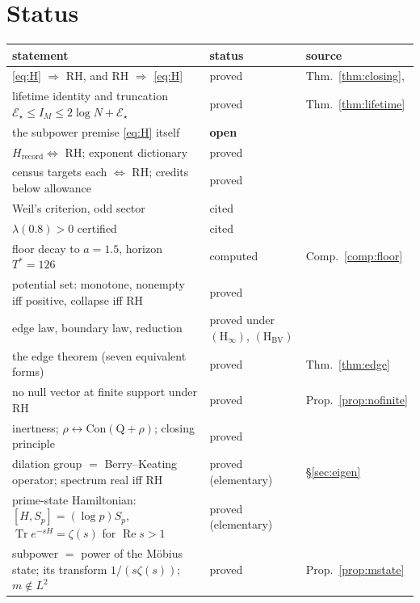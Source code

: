 \documentclass[11pt]{article}
\theoremstyle{definition}
\theoremstyle{remark}
\newcommand{\Con}{\mathrm{Con}}
\newcommand{\Tst}{T^{*}}
\newcommand{\Hrec}{H_{\mathrm{record}}}
\newcommand{\Ree}{\operatorname{Re}}
\begin{document}
\section{Status}\label{sec:status}
\begin{center}\footnotesize
\begin{tabular}{L{0.52\textwidth}L{0.2\textwidth}L{0.2\textwidth}}
\toprule
statement & status & source\\
\midrule
\eqref{eq:H} $\Rightarrow$ RH, and RH $\Rightarrow$ \eqref{eq:H} & proved & Thm.~\ref{thm:closing}, \cite{titchmarsh}\\
lifetime identity and truncation $\mathcal E_\star\le I_M\le2\log N+\mathcal E_\star$ & proved & Thm.~\ref{thm:lifetime}\\
the subpower premise \eqref{eq:H} itself & \textbf{open} & \cite{running,summary}\\
$\Hrec\iff$ RH; exponent dictionary & proved & \cite{hrec}\\
census targets each $\iff$ RH; credits below allowance & proved & \cite{census,censusaudit}\\
Weil's criterion, odd sector & cited & \cite{weil52,suzuki}\\
$\lambda(0.8)>0$ certified & cited & \cite{zhu}\\
floor decay to $a=1.5$, horizon $\Tst=126$ & computed & Comp.~\ref{comp:floor}\\
potential set: monotone, nonempty iff positive, collapse iff RH & proved & \cite{potential}\\
edge law, boundary law, reduction & proved under $(\mathrm H_\infty)$, $(\mathrm H_{\mathrm{BV}})$ & \cite{window}\\
the edge theorem (seven equivalent forms) & proved & Thm.~\ref{thm:edge}\\
no null vector at finite support under RH & proved & Prop.~\ref{prop:nofinite}\\
inertness; $\rho\leftrightarrow\Con(\mathrm Q+\rho)$; closing principle & proved & \cite{gstring}\\
dilation group $=$ Berry--Keating operator; spectrum real iff RH & proved (elementary) & \S\ref{sec:eigen}\\
prime-state Hamiltonian: $[H,S_p]=(\log p)S_p$, $\operatorname{Tr}e^{-sH}=\zeta(s)$ for $\Ree s>1$ & proved (elementary) & \cite{v32,bc}\\
subpower $=$ power of the Möbius state; its transform $1/(s\zeta(s))$; $m\notin L^2$ & proved & Prop.~\ref{prop:mstate}\\

\end{tabular}
\end{center}
\end{document}
